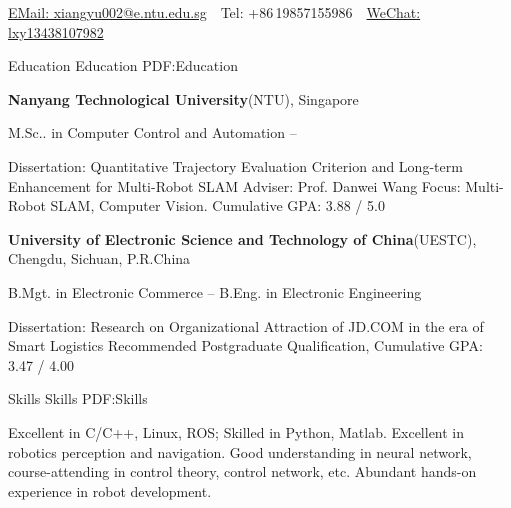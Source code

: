 \documentclass[letterpaper,MMMyyyy,nonstopmode]{simpleresumecv}
\newcommand{\CVAuthor}{Mike Xiangyu Liu}
\newcommand{\CVWebpage}{http://www.example.com/~johndoe}
\begin{document}

\Title{\CVAuthor}

\begin{SubTitle}
\par
\href{xiangyu002@e.ntu.edu.sg}
{EMail: xiangyu002@e.ntu.edu.sg}
\,\SubBulletSymbol\,
Tel: +86\,19857155986
\,\SubBulletSymbol\,
\href{\CVWebpage}
{WeChat: lxy13438107982}
\end{SubTitle}

\begin{Body}


\Section
{Education}
{Education}
{PDF:Education}

\Entry
{\textbf{Nanyang Technological University}(NTU)},
Singapore

\BulletItem
M.Sc.. in
{Computer Control and Automation}
\hfill
{} --
\begin{Detail}
\SubBulletItem
Dissertation:
{Quantitative Trajectory Evaluation Criterion and Long-term Enhancement for Multi-Robot SLAM\cite{xiangyu2019quantitative}}
\SubBulletItem
Adviser:
Prof. Danwei Wang
\SubBulletItem
Focus:
Multi-Robot SLAM, Computer Vision.
\SubBulletItem
Cumulative GPA: 3.88 / 5.0
\end{Detail}

\BigGap
\Entry
{\textbf{University of Electronic Science and Technology of China}(UESTC)},
Chengdu, Sichuan, P.R.China

\BulletItem
B.Mgt. in 
{Electronic Commerce}
\hfill
{} --
\BulletItem
B.Eng. in 
{Electronic Engineering}
\begin{Detail}
\SubBulletItem
Dissertation:
	{Research on Organizational Attraction of JD.COM in the era of Smart Logistics \cite{lxybachelor2018}}
\SubBulletItem
Recommended Postgraduate Qualification,
\SubBulletItem
Cumulative GPA: 3.47 / 4.00
\end{Detail}


\Section
{Skills}
{Skills}
{PDF:Skills}

\Entry
\BulletItem
Excellent in C/C++, Linux, ROS; Skilled in Python, Matlab.
\BulletItem
Excellent in robotics perception and navigation.
\BulletItem
Good understanding in neural network, course-attending in control theory, control network, etc.
\BulletItem
Abundant hands-on experience in robot development.


\end{Body}
\end{document}
